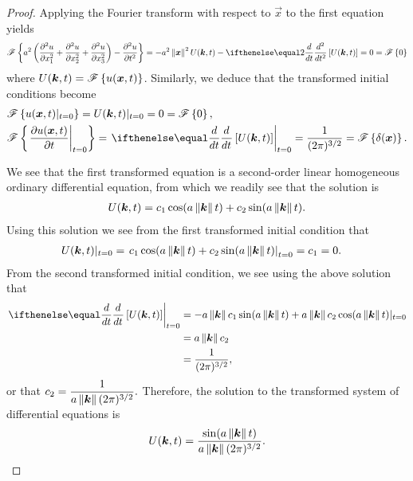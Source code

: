 \begin{proof}
  Applying the Fourier transform with respect to $\vec{x}$ to the first equation yields
  \begin{align*}
    \fourier{a^2\left(\frac{\partial^2 u}{\partial x_1^2} + \frac{\partial^2 u}{\partial x_2^2} + \frac{\partial^2 u}{\partial x_3^2}\right) - \frac{\partial^2 u}{\partial t^2}}
    =-a^2\norm{\vec{x}}^2U(\vec{k}, t)- \der{t}{2}\left[U(\vec{k}, t)\right] = 0 = \fourier{0}
  \end{align*}
  where $U(\boldsymbol{k}, t) = \mathscr{F}\left\{ {u(\boldsymbol{x}, t)} \right\}$. Similarly, we deduce that
  the transformed initial conditions become
  \begin{align*}
    &\fourier{u(\vec{x}, t)\rvert_{t=0}} = U(\vec{k}, t)\rvert_{t=0} = 0 = \fourier{0}, \\
    &\fourier{\left.\frac{\partial u(\vec{x}, t)}{\partial t}\right\rvert_{t=0}} = \left.\der{t}{}\left[U(\vec{k}, t)\right]\right\rvert_{t=0} = \frac{1}{(2\pi)^{3/2}} = \fourier{\delta(\vec{x})}.
  \end{align*}

  We see that the first transformed equation is a second-order
  linear homogeneous ordinary differential equation, from which we readily see that the solution is
  \begin{align*}
    U(\boldsymbol{k}, t) = c_1 \cos(a\left\Vert {\boldsymbol{k}} \right\Vert t) + c_2 \sin(a \left\Vert {\boldsymbol{k}} \right\Vert t).
  \end{align*}
  Using this solution we see from the first transformed initial condition that
  \begin{align*}
    U(\boldsymbol{k}, t)\rvert_{t=0}
    &= \left.c_1 \cos(a\left\Vert {\boldsymbol{k}} \right\Vert t) + c_2 \sin(a \left\Vert {\boldsymbol{k}} \right\Vert t)\right\rvert_{t=0} = c_1 = 0.
  \end{align*}
  From the second transformed initial condition, we see using the above solution that
  \begin{align*}
    \left.\der{t}{}\left[U(\vec{k}, t)\right]\right\rvert_{t=0}
    &= -a\norm{\vec{k}}c_1\sin(a\norm{\vec{k}}t) + a\norm{\vec{k}}c_2\cos(a\norm{\vec{k}}t)\rvert_{t=0} \\
    &= a\norm{\vec{k}}c_2 \\
    &= \frac{1}{(2\pi)^{3/2}},
  \end{align*}
  or that $\displaystyle c_2 = \frac{1}{a\left\Vert {\boldsymbol{k}} \right\Vert(2\pi)^{3/2}}.$ Therefore, the solution to the transformed
  system of differential equations is
  \begin{align*}
    U(\boldsymbol{k}, t) = \frac{\sin(a\left\Vert {\boldsymbol{k}} \right\Vert t)}{a\left\Vert {\boldsymbol{k}} \right\Vert(2\pi)^{3/2}}.
  \end{align*}


\end{proof}

